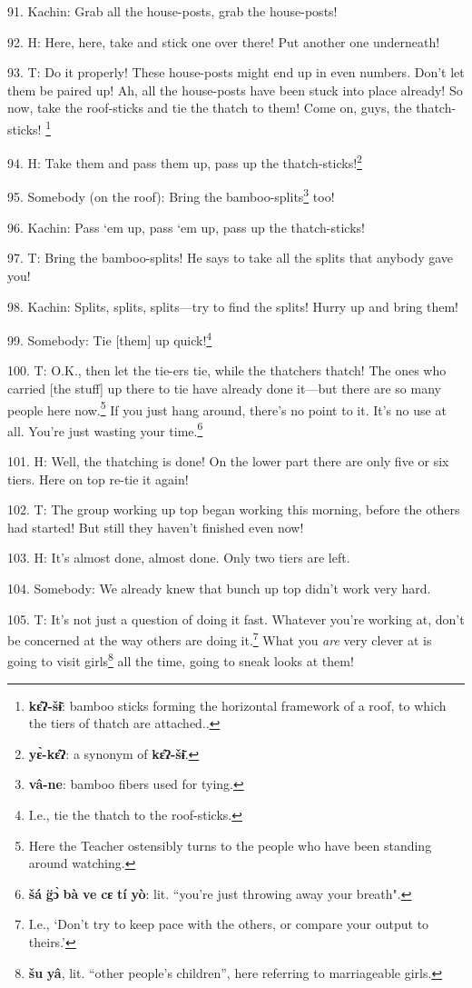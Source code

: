 91. Kachin: Grab all the house-posts, grab the house-posts!

92. H: Here, here, take and stick one over there! Put another one underneath!

93. T: Do it properly! These house-posts might end up in even numbers. Don't
let them be paired up! Ah, all the house-posts have been stuck into place already!
So now, take the roof-sticks and tie the thatch to them! Come on, guys, the thatch-sticks!
\footnote{\textbf{kɛ̂ʔ-šɨ̄}: bamboo sticks forming the horizontal framework of a roof, to which the tiers of thatch are attached..}

94. H: Take them and pass them up, pass up the thatch-sticks!\footnote{\textbf{yɛ̀-kɛ̂ʔ}: a synonym of \textbf{kɛ̂ʔ-šɨ̄}.}

95. Somebody (on the roof): Bring the bamboo-splits\footnote{\textbf{vâ-ne}: bamboo fibers used for tying.} too!

96. Kachin: Pass `em up, pass `em up, pass up the thatch-sticks!

97. T: Bring the bamboo-splits! He says to take all the splits that anybody gave
you!

98. Kachin: Splits, splits, splits---try to find the splits! Hurry up and bring
them!

99. Somebody: Tie [them] up quick!\footnote{I.e., tie the thatch to the roof-sticks.}

100. T: O.K., then let the tie-ers tie, while the thatchers thatch! The ones who
carried [the stuff] up there to tie have already done it---but there are so many
people here now.\footnote{Here the Teacher ostensibly turns to the people who have been standing around watching.} If you just hang around, there's no point to it. It's no
use at all. You're just wasting your time.\footnote{\textbf{šá} \textbf{g̈ɔ̀} \textbf{bà} \textbf{ve} \textbf{cɛ} \textbf{tí} \textbf{yò}: lit. ``you're just throwing away your breath".}

101. H: Well, the thatching is done! On the lower part there are only five or
six tiers. Here on top re-tie it again!

102. T: The group working up top began working this morning, before the others
had started! But still they haven't finished even now!

103. H: It's almost done, almost done. Only two tiers are left.

104. Somebody: We already knew that bunch up top didn't work very hard.

105. T: It's not just a question of doing it fast. Whatever you're working at,
don't be concerned at the way others are doing it.\footnote{I.e., `Don't try to keep pace with the others, or compare your output to theirs.'} What you \textit{are}
very clever at is going to visit girls\footnote{\textbf{šu} \textbf{yâ}, lit. ``other people's children'', here referring to marriageable girls.} all the time, going to sneak looks
at them!


